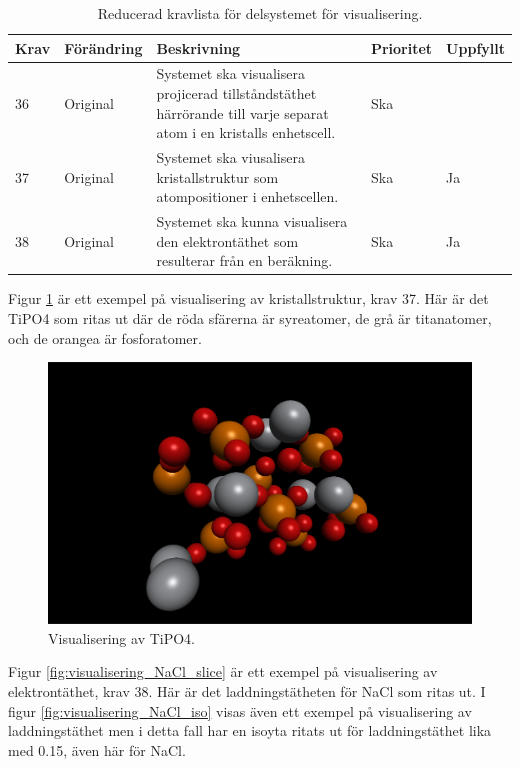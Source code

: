 \documentclass[a4paper,12pt]{article}
\begin{document}
\begin{table}[H]
\caption{Reducerad kravlista för delsystemet för visualisering.}
\begin{center}
\begin{tabular}{ |p{10mm}|p{20mm}|p{70mm}|p{15mm}|p{15mm}|}
\hline
 \textbf{Krav} & \textbf{Förändring} & \textbf{Beskrivning} & \textbf{Prioritet} & \textbf{Uppfyllt}  \\ 
\hline
36 & Original & Systemet ska visualisera projicerad tillståndstäthet härrörande till varje separat atom i en kristalls enhetscell. & Ska &  \\
\hline
37 & Original & Systemet ska viusalisera kristallstruktur som atompositioner i enhetscellen. & Ska & Ja \\
\hline
38 & Original & Systemet ska kunna visualisera den elektrontäthet som resulterar från en beräkning. & Ska & Ja \\
\hline
\end{tabular}
\label{table:kravlista visualisering}
\end{center}
\end{table}

Figur \ref{fig:visualisering_TiPO4} är ett exempel på visualisering av kristallstruktur, krav 37. Här är det TiPO4 som ritas ut där de röda sfärerna är syreatomer, de grå är titanatomer, och de orangea är fosforatomer.
\begin{figure}[H]
	\centering
	\includegraphics[scale=0.15]{TiPO4_visualisering.png}
	\caption{Visualisering av TiPO4.}
	\label{fig:visualisering_TiPO4}
\end{figure}

Figur \ref{fig:visualisering_NaCl_slice} är ett exempel på visualisering av elektrontäthet, krav 38. Här är det laddningstätheten för NaCl som ritas ut. I figur  \ref{fig:visualisering_NaCl_iso} visas även ett exempel på visualisering av laddningstäthet men i detta fall har en isoyta ritats ut för laddningstäthet lika med 0.15, även här för NaCl.
\end{document}
